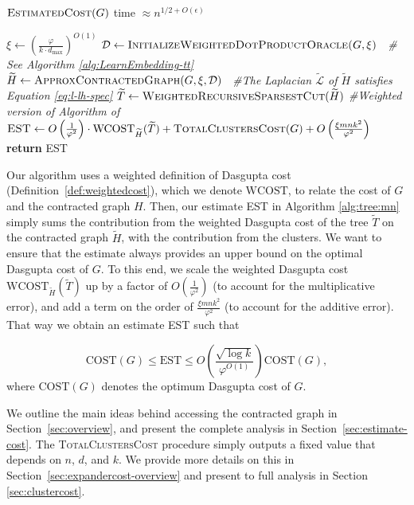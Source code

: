 \documentclass[letterpaper,11pt]{article}
\newcommand{\CT}{\text{COST}}
\newcommand{\wCT}{\text{WCOST}}
\newcommand{\est}{O\left(\frac{1}{\varphi^2}\right)\cdot  \wCT_{\wt{H}}(\wt{T}) + \textsc{TotalClustersCost}(G)+ O\left(\frac{\xi m n k^2 }{\varphi^2} \right) }
\newcommand{\estg}{\textsc{EST}}
\theoremstyle{plain}
\theoremstyle{definition}
\theoremstyle{remark}
\newcommand{\wt}[1]{\widetilde{#1}}
\newcommand{\return}{\textbf{return }}
\begin{document}
\begin{algorithm}[H]
\caption{$\textsc{EstimatedCost}(G)$ {\qquad  \qquad\qquad\qquad\qquad \qquad \qquad \qquad  time  $\approx n^{1/2+O(\epsilon)}$}
}
\label{alg:tree:mn}
\begin{algorithmic}[1]
\STATE $\xi \gets \left(\frac{\varphi}{k\cdot d_{\max}}\right)^{O(1)}$
\STATE $\mathcal{D} \gets \textsc{InitializeWeightedDotProductOracle($G,\xi$)}$ \textit{\qquad\qquad\ \qquad \quad  \# See Algorithm \ref{alg:LearnEmbedding-tt}}
\STATE $\widetilde{H} \gets\textsc{ApproxContractedGraph}(G, \xi,\mathcal{D})$ \textit{\quad \ \#The Laplacian $\widetilde{\mathcal{L}}$ of $\widetilde{H}$ satisfies Equation \eqref{eq:l-lh-spec}}
\STATE $\widetilde{T} \gets \textsc{WeightedRecursiveSparsestCut}(\widetilde H)$ \textit{\qquad  \#Weighted version of Algorithm of~\cite{charikar2017approximate}}
\STATE $\estg \gets \est$
\STATE \return \estg
\end{algorithmic}
\end{algorithm}
Our algorithm uses a weighted definition of Dasgupta cost (Definition~\ref{def:weightedcost}), which we denote $\wCT$, to relate the cost of $G$ and the contracted graph $H$. 
Then, our estimate EST in Algorithm \ref{alg:tree:mn} simply sums the contribution from the weighted Dasgupta cost of the tree $\widetilde{T}$ on the contracted graph $\widetilde{H}$, with the contribution from the clusters. We want to ensure that the estimate always provides an upper bound on the optimal Dasgupta cost of $G$. To this end, we scale the weighted Dasgupta cost $\wCT_{\widetilde{H}}(\widetilde{T})$ up by a factor of $O\left(\frac{1}{\varphi^2} \right)$ (to account for the multiplicative error), and add a term on the order of $\frac{\xi mn k^2}{\varphi^2}$ (to account for the additive error). That way we obtain an estimate EST such that

\[\CT(G) \leq \text{EST} \leq O\left(\frac{\sqrt{ \log k}}{\varphi^{O(1)}} \right)\CT(G), \]
where $\CT(G) $ denotes the optimum Dasgupta cost of $G$. 

We outline the main ideas behind accessing the contracted graph in Section~\ref{sec:overview}, and present the complete analysis in Section~\ref{sec:estimate-cost}. The\textsc{
TotalClustersCost} procedure simply outputs a fixed value that depends on $n$, $d$, and $k$. We provide more details on this in Section~\ref{sec:expandercost-overview} and present to full analysis in Section \ref{sec:clustercost}. 
\end{document}
